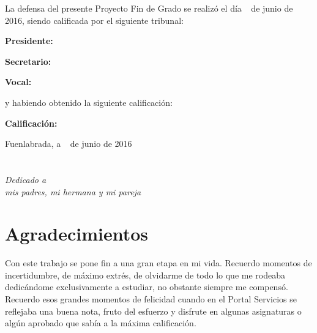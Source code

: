 \documentclass[a4paper, 12pt]{book}
\begin{document}
\vspace{1cm}
La defensa del presente Proyecto Fin de Grado se realizó el día \qquad$\;\,$ de junio de 2016, siendo calificada por el siguiente tribunal:


\vspace{0.5cm}
\textbf{Presidente:}

\vspace{1.2cm}
\textbf{Secretario:}

\vspace{1.2cm}
\textbf{Vocal:}


\vspace{1.2cm}
y habiendo obtenido la siguiente calificación:

\vspace{1cm}
\textbf{Calificación:}


\vspace{1cm}
\begin{flushright}
Fuenlabrada, a \qquad$\;\,$ de junio de 2016
\end{flushright}

\setlength{\parskip}{2mm}

\chapter*{}
\begin{flushright}
\textit{Dedicado a \\
mis padres, mi hermana y mi pareja}
\end{flushright}


\chapter*{Agradecimientos}

Con este trabajo se pone fin a una gran etapa en mi vida. Recuerdo momentos de incertidumbre, de máximo extrés, de olvidarme de todo lo que me rodeaba dedicándome exclusivamente a estudiar, no obstante siempre me compensó. Recuerdo esos grandes momentos de felicidad cuando en el Portal Servicios se reflejaba una buena nota, fruto del esfuerzo y disfrute en algunas asignaturas o algún aprobado que sabía a la máxima calificación.
\end{document}
